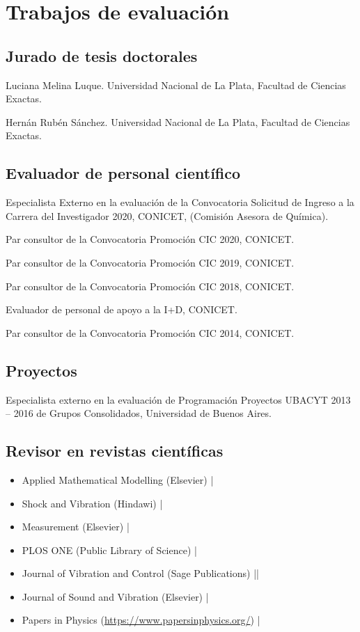 \section{Trabajos de evaluación}

\subsection{Jurado de tesis doctorales}
 Luciana Melina Luque. Universidad Nacional de La Plata, Facultad de Ciencias Exactas.

 Hernán Rubén Sánchez. Universidad Nacional de La Plata, Facultad de Ciencias Exactas.

\subsection{Evaluador de personal científico}

 Especialista Externo en la evaluación de la Convocatoria Solicitud de Ingreso a la Carrera del Investigador 2020, CONICET,
(Comisión Asesora de Química).

 Par consultor de la Convocatoria Promoción CIC 2020, CONICET.

 Par consultor de la Convocatoria Promoción CIC 2019, CONICET.

 Par consultor de la Convocatoria Promoción CIC 2018, CONICET.

 Evaluador de personal de apoyo a la I+D, CONICET.

 Par consultor de la Convocatoria Promoción CIC 2014, CONICET.

\subsection{Proyectos}
 Especialista externo en la evaluación de Programación Proyectos UBACYT 2013 -- 2016 de Grupos Consolidados, Universidad de Buenos Aires.

\subsection{Revisor en revistas científicas}
\begin{itemize}
 \item Applied Mathematical Modelling (Elsevier) {\small \faCaretRight{}} |
 \item Shock and Vibration (Hindawi) {\small \faCaretRight{}} |
 \item Measurement (Elsevier) {\small \faCaretRight{}} |
 \item PLOS ONE (Public Library of Science) {\small \faCaretRight{}} |
 \item Journal of Vibration and Control (Sage Publications) {\small \faCaretRight{}}  ||
 \item Journal of Sound and Vibration (Elsevier) {\small \faCaretRight{}} \cancel{||||} |
 \item Papers in Physics (\url{https://www.papersinphysics.org/}) {\small \faCaretRight{}} |
\end{itemize}

